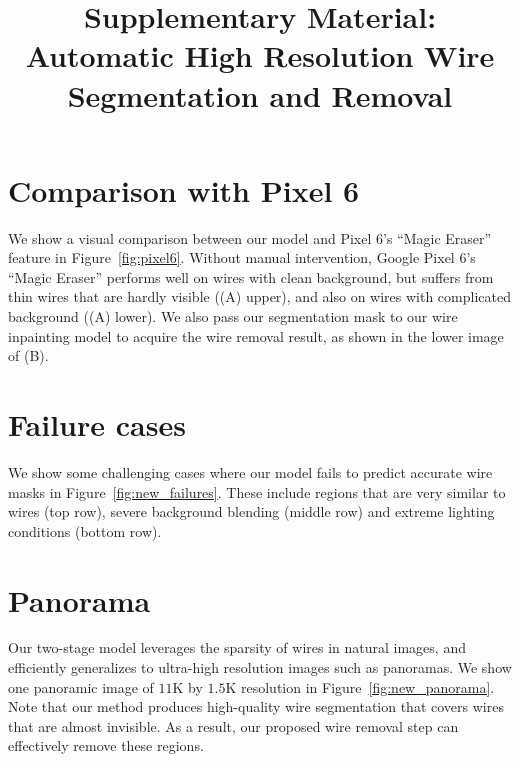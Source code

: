 \documentclass[10pt,twocolumn,letterpaper]{article}
\title{Supplementary Material: Automatic High Resolution Wire Segmentation and Removal}
\begin{document}

\maketitle
\thispagestyle{empty}


\vspace{-1mm}
\section{Comparison with Pixel 6}
\vspace{-1mm}
We show a visual comparison between our model and Pixel 6's ``Magic Eraser'' feature in Figure~\ref{fig:pixel6}. Without manual intervention, Google Pixel 6's ``Magic Eraser'' performs well on wires with clean background, but suffers from thin wires that are hardly visible ((A) upper), and also on wires with complicated background ((A) lower). We also pass our segmentation mask to our wire inpainting model to acquire the wire removal result, as shown in the lower image of (B).

\vspace{-1mm}
\section{Failure cases}
\vspace{-1mm}
We show some challenging cases where our model fails to predict accurate wire masks in Figure~\ref{fig:new_failures}. These include regions that are very similar to wires (top row), severe background blending (middle row) and extreme lighting conditions (bottom row).

\vspace{-1mm}
\section{Panorama}
\vspace{-1mm}
Our two-stage model leverages the sparsity of wires in natural images, and efficiently generalizes to ultra-high resolution images such as panoramas. We show one panoramic image of $11$K by $1.5$K resolution in Figure~\ref{fig:new_panorama}. Note that our method produces high-quality wire segmentation that covers wires that are almost invisible. As a result, our proposed wire removal step can effectively remove these regions.
\end{document}
